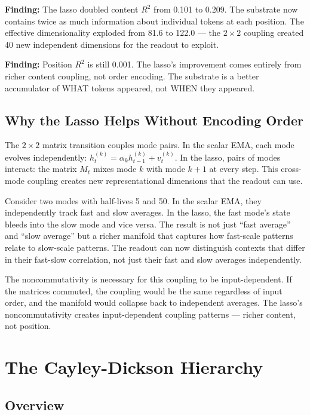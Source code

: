 \documentclass[11pt,a4paper]{report}
\newcommand{\finding}[1]{\textcolor{finding}{\textbf{Finding:}} #1}
\begin{document}
\finding{The lasso doubled content $R^2$ from 0.101 to 0.209.} The substrate now contains twice as much information about individual tokens at each position. The effective dimensionality exploded from 81.6 to 122.0 --- the $2 \times 2$ coupling created 40 new independent dimensions for the readout to exploit.

\finding{Position $R^2$ is still 0.001.} The lasso's improvement comes entirely from richer content coupling, not order encoding. The substrate is a better accumulator of WHAT tokens appeared, not WHEN they appeared.

\section{Why the Lasso Helps Without Encoding Order}

The $2 \times 2$ matrix transition couples mode pairs. In the scalar EMA, each mode evolves independently: $h_t^{(k)} = \alpha_k h_{t-1}^{(k)} + v_t^{(k)}$. In the lasso, pairs of modes interact: the matrix $M_t$ mixes mode $k$ with mode $k+1$ at every step. This cross-mode coupling creates new representational dimensions that the readout can use.

Consider two modes with half-lives 5 and 50. In the scalar EMA, they independently track fast and slow averages. In the lasso, the fast mode's state bleeds into the slow mode and vice versa. The result is not just ``fast average'' and ``slow average'' but a richer manifold that captures how fast-scale patterns relate to slow-scale patterns. The readout can now distinguish contexts that differ in their fast-slow correlation, not just their fast and slow averages independently.

The noncommutativity is necessary for this coupling to be input-dependent. If the matrices commuted, the coupling would be the same regardless of input order, and the manifold would collapse back to independent averages. The lasso's noncommutativity creates input-dependent coupling patterns --- richer content, not position.


\chapter{The Cayley-Dickson Hierarchy}

\section{Overview}
\end{document}
